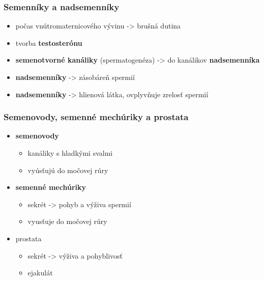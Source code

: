 \documentclass[
]{article}
\providecommand{\tightlist}{%
  \setlength{\itemsep}{0pt}\setlength{\parskip}{0pt}}
\begin{document}
\hypertarget{semennuxedky-a-nadsemennuxedky}{%
\subsubsection{Semenníky a
nadsemenníky}\label{semennuxedky-a-nadsemennuxedky}}

\begin{itemize}
\tightlist
\item
  počas vnútromaternicového vývinu -\textgreater{} brušná dutina
\item
  tvorba \textbf{testosterónu}
\item
  \textbf{semenotvorné kanáliky} (spermatogenéza) -\textgreater{} do
  kanálikov \textbf{nadsemenníka}
\item
  \textbf{nadsemenníky} -\textgreater{} zásobáreň spermií
\item
  \textbf{nadsemenníky} -\textgreater{} hlienová látka, ovplyvňuje
  zrelosť spermií
\end{itemize}

\hypertarget{semenovody-semennuxe9-mechuxfariky-a-prostata}{%
\subsubsection{Semenovody, semenné mechúriky a
prostata}\label{semenovody-semennuxe9-mechuxfariky-a-prostata}}

\begin{itemize}
\tightlist
\item
  \textbf{semenovody}

  \begin{itemize}
  \tightlist
  \item
    kanáliky s hladkými svalmi
  \item
    vyúsťujú do močovej rúry
  \end{itemize}
\item
  \textbf{semenné mechúriky}

  \begin{itemize}
  \tightlist
  \item
    sekrét -\textgreater{} pohyb a výživa spermií
  \item
    vyusťuje do močovej rúry
  \end{itemize}
\item
  prostata

  \begin{itemize}
  \tightlist
  \item
    sekrét -\textgreater{} výživa a pohyblivosť
  \item
    ejakulát
  \end{itemize}
\end{itemize}
\end{document}
